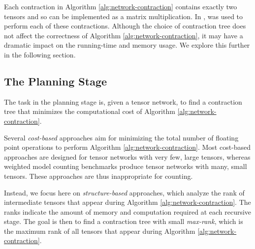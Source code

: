 Each contraction in Algorithm \ref{alg:network-contraction} contains exactly two tensors and so can be implemented as a matrix multiplication. In \cite{DDV19},  \cite{numpy} was used to perform each of these contractions. %
Although the choice of contraction tree does not affect the correctness of Algorithm \ref{alg:network-contraction}, it may have a dramatic impact on the running-time and memory usage. We explore this further in the following section.

\subsection{The Planning Stage}
\label{sec:algorithm:planning}
The task in the planning stage is, given a tensor network, to find a contraction tree that minimizes the computational cost of Algorithm \ref{alg:network-contraction}.

Several \emph{cost-based} approaches \cite{Hirata03,PHV14} aim for minimizing the total number of floating point operations to perform Algorithm \ref{alg:network-contraction}. Most cost-based approaches are designed for tensor networks with very few, large tensors, whereas weighted model counting benchmarks produce tensor networks with many, small tensors. These approaches are thus inappropriate for counting.

Instead, we focus here on \emph{structure-based} approaches, which analyze the rank of intermediate tensors that appear during Algorithm \ref{alg:network-contraction}. The ranks indicate the amount of memory and computation required at each recursive stage. The goal is then to find a contraction tree with small \emph{max-rank}, which is the maximum rank of all tensors that appear during Algorithm \ref{alg:network-contraction}.

